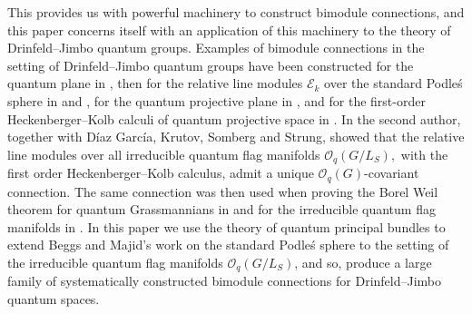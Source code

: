 \documentclass[10pt,a4paper]{amsart}
\numberwithin{equation}{section}
\begin{document}
This provides us with powerful machinery to construct bimodule connections, and this paper concerns itself with an application of this machinery to the theory of Drinfeld--Jimbo quantum groups.
Examples of bimodule connections in the setting of Drinfeld--Jimbo quantum groups have been constructed for the quantum plane in \cite{MouradDVMadore94}, then for the relative line modules $\mathcal{E}_{k}$ over the standard Podle\'s sphere in \cite{KLVSCP1} and \cite[Example 5.23]{BeggsMajid:Leabh}, for the quantum projective plane in \cite{KM11}, and for the first-order Heckenberger--Kolb calculi of quantum projective space in \cite{M20}. In \cite{HVBQFM} the second author, together with D\'iaz Garc\'ia, Krutov, Somberg and Strung, showed that the relative line modules over all irreducible quantum flag manifolds $\mathcal{O}_q(G/L_S),$ with the first order Heckenberger--Kolb calculus, admit a unique $\mathcal{O}_q(G)$-covariant connection. The same connection was then used when proving the Borel Weil theorem for quantum Grassmannians in \cite{BwGrass} and for the irreducible quantum flag manifolds in \cite{CDOBBW}.
In this paper we use the theory of quantum principal bundles to extend Beggs and Majid's work on the standard Podle\'{s} sphere to the setting of the irreducible quantum flag manifolds $\mathcal{O}_q(G/L_S)$, and so, produce a large family of systematically constructed bimodule connections for Drinfeld--Jimbo quantum spaces.
\end{document}
